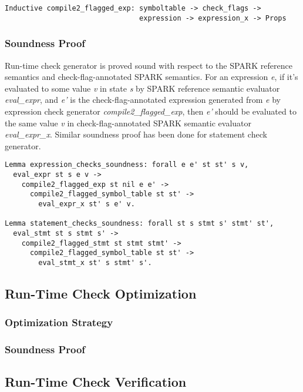 \begin{lstlisting}[escapechar=\#, language=coq, basicstyle=\small] 
Inductive compile2_flagged_exp: symboltable -> check_flags -> 
                                expression -> expression_x -> Props
\end{lstlisting}

\subsubsection{Soundness Proof}
Run-time check generator is proved sound with respect to the SPARK reference
semantics and check-flag-annotated SPARK semantics. For an expression
\textit{e}, if it's evaluated to some value \textit{v} in state \textit{s} by
SPARK reference semantic evaluator \textit{eval\_expr}, and \textit{e'} is the
check-flag-annotated expression generated from \textit{e} by expression check
generator \textit{compile2\_flagged\_exp}, then \textit{e'} should be evaluated
to the same value \textit{v} in check-flag-annotated SPARK semantic evaluator
\textit{eval\_expr\_x}. Similar soundness proof has been done for statement
check generator.

\begin{lstlisting}[escapechar=\#, language=coq, basicstyle=\small]
Lemma expression_checks_soundness: forall e e' st st' s v,
  eval_expr st s e v ->
    compile2_flagged_exp st nil e e' ->
      compile2_flagged_symbol_table st st' ->
        eval_expr_x st' s e' v.
        
Lemma statement_checks_soundness: forall st s stmt s' stmt' st',
  eval_stmt st s stmt s' -> 
    compile2_flagged_stmt st stmt stmt' ->
      compile2_flagged_symbol_table st st' ->
        eval_stmt_x st' s stmt' s'.
\end{lstlisting}

\subsection{Run-Time Check Optimization}
\subsubsection{Optimization Strategy}
\subsubsection{Soundness Proof}

\subsection{Run-Time Check Verification}












